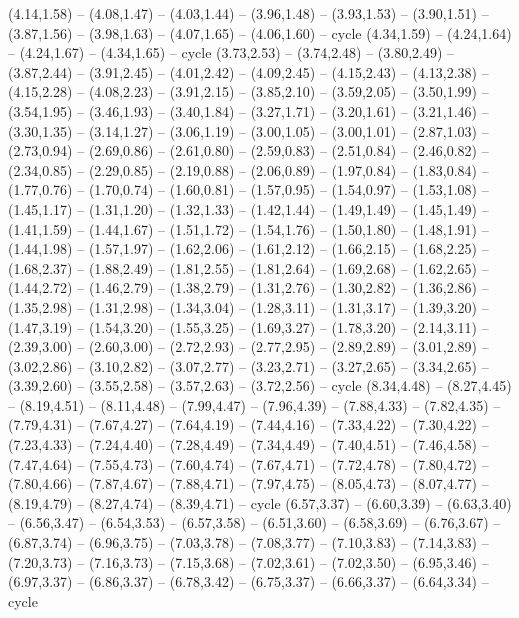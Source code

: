 \expandafter\def\csname geo:gebiet:ESP\endcsname{
  (4.14,1.58) -- (4.08,1.47) -- (4.03,1.44) -- (3.96,1.48) -- (3.93,1.53) -- (3.90,1.51) -- (3.87,1.56) -- (3.98,1.63) -- (4.07,1.65) -- (4.06,1.60) -- cycle
  (4.34,1.59) -- (4.24,1.64) -- (4.24,1.67) -- (4.34,1.65) -- cycle
  (3.73,2.53) -- (3.74,2.48) -- (3.80,2.49) -- (3.87,2.44) -- (3.91,2.45) -- (4.01,2.42) -- (4.09,2.45) -- (4.15,2.43) -- (4.13,2.38) -- (4.15,2.28) -- (4.08,2.23) -- (3.91,2.15) -- (3.85,2.10) -- (3.59,2.05) -- (3.50,1.99) -- (3.54,1.95) -- (3.46,1.93) -- (3.40,1.84) -- (3.27,1.71) -- (3.20,1.61) -- (3.21,1.46) -- (3.30,1.35) -- (3.14,1.27) -- (3.06,1.19) -- (3.00,1.05) -- (3.00,1.01) -- (2.87,1.03) -- (2.73,0.94) -- (2.69,0.86) -- (2.61,0.80) -- (2.59,0.83) -- (2.51,0.84) -- (2.46,0.82) -- (2.34,0.85) -- (2.29,0.85) -- (2.19,0.88) -- (2.06,0.89) -- (1.97,0.84) -- (1.83,0.84) -- (1.77,0.76) -- (1.70,0.74) -- (1.60,0.81) -- (1.57,0.95) -- (1.54,0.97) -- (1.53,1.08) -- (1.45,1.17) -- (1.31,1.20) -- (1.32,1.33) -- (1.42,1.44) -- (1.49,1.49) -- (1.45,1.49) -- (1.41,1.59) -- (1.44,1.67) -- (1.51,1.72) -- (1.54,1.76) -- (1.50,1.80) -- (1.48,1.91) -- (1.44,1.98) -- (1.57,1.97) -- (1.62,2.06) -- (1.61,2.12) -- (1.66,2.15) -- (1.68,2.25) -- (1.68,2.37) -- (1.88,2.49) -- (1.81,2.55) -- (1.81,2.64) -- (1.69,2.68) -- (1.62,2.65) -- (1.44,2.72) -- (1.46,2.79) -- (1.38,2.79) -- (1.31,2.76) -- (1.30,2.82) -- (1.36,2.86) -- (1.35,2.98) -- (1.31,2.98) -- (1.34,3.04) -- (1.28,3.11) -- (1.31,3.17) -- (1.39,3.20) -- (1.47,3.19) -- (1.54,3.20) -- (1.55,3.25) -- (1.69,3.27) -- (1.78,3.20) -- (2.14,3.11) -- (2.39,3.00) -- (2.60,3.00) -- (2.72,2.93) -- (2.77,2.95) -- (2.89,2.89) -- (3.01,2.89) -- (3.02,2.86) -- (3.10,2.82) -- (3.07,2.77) -- (3.23,2.71) -- (3.27,2.65) -- (3.34,2.65) -- (3.39,2.60) -- (3.55,2.58) -- (3.57,2.63) -- (3.72,2.56) -- cycle}
\expandafter\def\csname geo:gebiet:SVK\endcsname{
  (8.34,4.48) -- (8.27,4.45) -- (8.19,4.51) -- (8.11,4.48) -- (7.99,4.47) -- (7.96,4.39) -- (7.88,4.33) -- (7.82,4.35) -- (7.79,4.31) -- (7.67,4.27) -- (7.64,4.19) -- (7.44,4.16) -- (7.33,4.22) -- (7.30,4.22) -- (7.23,4.33) -- (7.24,4.40) -- (7.28,4.49) -- (7.34,4.49) -- (7.40,4.51) -- (7.46,4.58) -- (7.47,4.64) -- (7.55,4.73) -- (7.60,4.74) -- (7.67,4.71) -- (7.72,4.78) -- (7.80,4.72) -- (7.80,4.66) -- (7.87,4.67) -- (7.88,4.71) -- (7.97,4.75) -- (8.05,4.73) -- (8.07,4.77) -- (8.19,4.79) -- (8.27,4.74) -- (8.39,4.71) -- cycle}
\expandafter\def\csname geo:gebiet:SVN\endcsname{
  (6.57,3.37) -- (6.60,3.39) -- (6.63,3.40) -- (6.56,3.47) -- (6.54,3.53) -- (6.57,3.58) -- (6.51,3.60) -- (6.58,3.69) -- (6.76,3.67) -- (6.87,3.74) -- (6.96,3.75) -- (7.03,3.78) -- (7.08,3.77) -- (7.10,3.83) -- (7.14,3.83) -- (7.20,3.73) -- (7.16,3.73) -- (7.15,3.68) -- (7.02,3.61) -- (7.02,3.50) -- (6.95,3.46) -- (6.97,3.37) -- (6.86,3.37) -- (6.78,3.42) -- (6.75,3.37) -- (6.66,3.37) -- (6.64,3.34) -- cycle}
